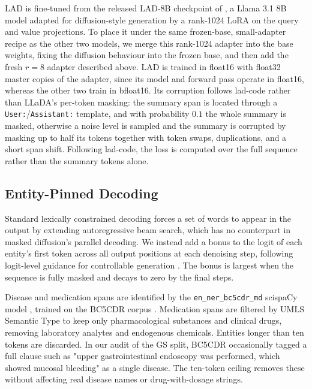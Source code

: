 \documentclass[11pt]{article}
\begin{document}
LAD is fine-tuned from the released LAD-8B checkpoint of \citet{kuiper2025lad}, a
Llama 3.1 8B model adapted for diffusion-style generation by a rank-1024 LoRA on the
query and value projections. To place it under the same frozen-base, small-adapter
recipe as the other two models, we merge this rank-1024 adapter into the base
weights, fixing the diffusion behaviour into the frozen base, and then add the fresh
$r = 8$ adapter described above. LAD is trained in float16 with float32 master copies
of the adapter, since its model and forward pass operate in float16, whereas the
other two train in bfloat16. Its corruption follows lad-code rather than LLaDA's
per-token masking: the summary span is located through a \texttt{User:}/\texttt{Assistant:}
template, and with probability $0.1$ the whole summary is masked, otherwise a noise
level is sampled and the summary is corrupted by masking up to half its tokens
together with token swaps, duplications, and a short span shift. Following lad-code,
the loss is computed over the full sequence rather than the summary tokens alone.

\subsection{Entity-Pinned Decoding}
\label{sec:entity_pinning}

Standard lexically constrained decoding \citep{hokamp2017lexically} forces a
set of words to appear in the output by extending autoregressive beam search,
which has no counterpart in masked diffusion's parallel decoding. We instead add a bonus to the logit of each entity's first token
across all output positions at each denoising step, following logit-level
guidance for controllable generation \citep{yang2021fudge}. The bonus is largest when the sequence is fully masked and decays to zero by the final steps.

Disease and medication spans are identified by the \texttt{en\_ner\_bc5cdr\_md}
scispaCy model \citep{neumann2019scispacy}, trained on the BC5CDR corpus
\citep{li2016biocreative}. Medication spans are filtered by UMLS Semantic Type
\citep{bodenreider2004umls} to keep only pharmacological substances and clinical
drugs, removing laboratory analytes and endogenous chemicals. Entities longer than ten tokens are discarded. In our audit of the GS split,
BC5CDR occasionally tagged a full clause such as "upper gastrointestinal endoscopy was performed, which showed mucosal bleeding" as a single disease. The ten-token ceiling removes these without affecting real disease names or drug-with-dosage strings.
\end{document}
